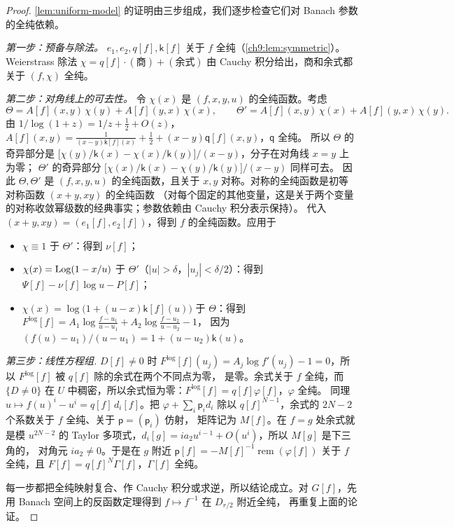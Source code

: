 \begin{proof}
\cref{lem:uniform-model} 的证明由三步组成，我们逐步检查它们对 Banach 参数的全纯依赖。

\emph{第一步：预备与除法。} $e_1,e_2,q[f],\mathsf k[f]$ 关于 $f$ 全纯（\cref{ch9:lem:symmetric}）。
Weierstrass 除法 $\chi=q[f]\cdot(\text{商})+(\text{余式})$ 由 Cauchy 积分给出，商和余式都关于 $(f,\chi)$ 全纯。

\emph{第二步：对角线上的可去性。} 令 $\chi(x)$ 是 $(f,x,y,u)$ 的全纯函数。考虑
\[
 \Theta=A[f](x,y)\,\chi(y)+A[f](y,x)\,\chi(x),\qquad \Theta'=A[f](x,y)\,\chi(x)+A[f](y,x)\,\chi(y).
\]
由 $1/\log(1+z)=1/z+\tfrac12+O(z)$，$A[f](x,y)=\frac1{(x-y)\mathsf k[f](x)}+\tfrac12+(x-y)\mathsf q[f](x,y)$，$\mathsf q$ 全纯。
所以 $\Theta$ 的奇异部分是 $\bigl[\chi(y)/\mathsf k(x)-\chi(x)/\mathsf k(y)\bigr]/(x-y)$，分子在对角线 $x=y$ 上为零；
$\Theta'$ 的奇异部分 $\bigl[\chi(x)/\mathsf k(x)-\chi(y)/\mathsf k(y)\bigr]/(x-y)$ 同样可去。
因此 $\Theta,\Theta'$ 是 $(f,x,y,u)$ 的全纯函数，且关于 $x,y$ 对称。对称的全纯函数是初等对称函数 $(x+y,xy)$ 的全纯函数
（对每个固定的其他变量，这是关于两个变量的对称收敛幂级数的经典事实；参数依赖由 Cauchy 积分表示保持）。
代入 $(x+y,xy)=(e_1[f],e_2[f])$，得到 $f$ 的全纯函数。应用于
\begin{itemize}
\item $\chi\equiv1$ 于 $\Theta'$：得到 $\nu[f]$；
\item $\chi(x)=\operatorname{Log}(1-x/u)$ 于 $\Theta'$（$|u|>\delta$，$|u_j|<\delta/2$）：得到 $\Psi[f]-\nu[f]\log u-P[f]$；
\item $\chi(x)=\log\bigl(1+(u-x)\mathsf k[f](u)\bigr)$ 于 $\Theta$：得到 $F^{\log}[f]=A_1\log\frac{f-u_1}{u-u_1}+A_2\log\frac{f-u_2}{u-u_2}-1$，
  因为 $(f(u)-u_1)/(u-u_1)=1+(u-u_2)\mathsf k(u)$。
\end{itemize}

\emph{第三步：线性方程组.} $D[f]\ne0$ 时 $F^{\log}[f](u_j)=A_j\log f'(u_j)-1=0$，所以 $F^{\log}[f]$ 被 $q[f]$ 除的余式在两个不同点为零，
是零。余式关于 $f$ 全纯，而 $\{D\ne0\}$ 在 $U$ 中稠密，所以余式恒为零：$F^{\log}[f]=q[f]\varphi[f]$，$\varphi$ 全纯。
同理 $u\mapsto f(u)^i-u^i=q[f]\,d_i[f]$。把 $\varphi+\sum_i\mathsf p_id_i$ 除以 $q[f]^{N-1}$，余式的 $2N-2$ 个系数关于 $f$ 全纯、关于 $\mathsf p=(\mathsf p_i)$ 仿射，
矩阵记为 $M[f]$。在 $f=g$ 处余式就是模 $u^{2N-2}$ 的 Taylor 多项式，$d_i[g]=ia_2u^{i-1}+O(u^i)$，所以 $M[g]$ 是下三角的，
对角元 $ia_2\ne0$。于是在 $g$ 附近 $\mathsf p[f]=-M[f]^{-1}\operatorname{rem}(\varphi[f])$ 关于 $f$ 全纯，且 $F[f]=q[f]^N\Gamma[f]$，$\Gamma[f]$ 全纯。

每一步都把全纯映射复合、作 Cauchy 积分或求逆，所以结论成立。对 $G[f]$，先用 Banach 空间上的反函数定理得到 $f\mapsto f^{-1}$ 在 $D_{r/2}$ 附近全纯，
再重复上面的论证。
\end{proof}

